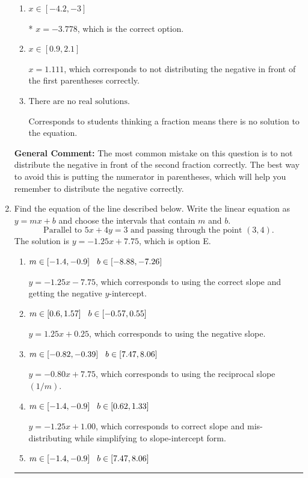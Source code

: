 \documentclass{extbook}[14pt]
\newcommand{\litem}[1]{\item #1

\rule{\textwidth}{0.4pt}}
\begin{document}
\begin{enumerate}
{\begin{enumerate}[label=\Alph*.]
$x = 0.303$, which corresponds to getting the negative of the actual solution.
\item \( x \in [-4.2, -3] \)

* $x = -3.778$, which is the correct option.
\item \( x \in [0.9, 2.1] \)

$x = 1.111$, which corresponds to not distributing the negative in front of the first parentheses correctly.
\item \( \text{There are no real solutions.} \)

Corresponds to students thinking a fraction means there is no solution to the equation.
\end{enumerate}

\textbf{General Comment:} The most common mistake on this question is to not distribute the negative in front of the second fraction correctly. The best way to avoid this is putting the numerator in parentheses, which will help you remember to distribute the negative correctly.
}
\litem{
Find the equation of the line described below. Write the linear equation as $ y=mx+b $ and choose the intervals that contain $m$ and $b$.
\[ \text{Parallel to } 5 x + 4 y = 3 \text{ and passing through the point } (3, 4). \]The solution is \( y = -1.25x + 7.75 \), which is option E.\begin{enumerate}[label=\Alph*.]
\item \( m \in [-1.4, -0.9] \hspace*{3mm} b \in [-8.88, -7.26] \)

 $y = -1.25x - 7.75$, which corresponds to using the correct slope and getting the negative $y$-intercept.
\item \( m \in [0.6, 1.57] \hspace*{3mm} b \in [-0.57, 0.55] \)

 $y = 1.25x + 0.25$, which corresponds to using the negative slope.
\item \( m \in [-0.82, -0.39] \hspace*{3mm} b \in [7.47, 8.06] \)

 $y = -0.80x + 7.75$, which corresponds to using the reciprocal slope $(1/m)$.
\item \( m \in [-1.4, -0.9] \hspace*{3mm} b \in [0.62, 1.33] \)

 $y = -1.25x + 1.00$, which corresponds to correct slope and mis-distributing while simplifying to slope-intercept form.
\item \( m \in [-1.4, -0.9] \hspace*{3mm} b \in [7.47, 8.06] \)


\end{enumerate}}
\end{enumerate}
\end{document}
